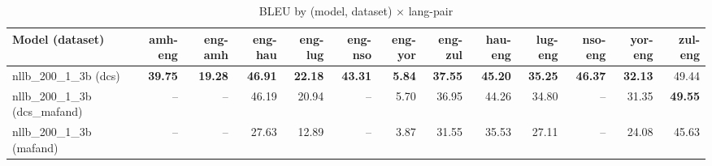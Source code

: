 \begin{table}[t]
\centering
\caption{BLEU by (model, dataset) × lang-pair}
\begin{tabular}{lrrrrrrrrrrrr}
\toprule
Model (dataset) & amh-eng & eng-amh & eng-hau & eng-lug & eng-nso & eng-yor & eng-zul & hau-eng & lug-eng & nso-eng & yor-eng & zul-eng \\
\midrule
nllb\_200\_1\_3b (dcs) & \textbf{39.75} & \textbf{19.28} & \textbf{46.91} & \textbf{22.18} & \textbf{43.31} & \textbf{5.84} & \textbf{37.55} & \textbf{45.20} & \textbf{35.25} & \textbf{46.37} & \textbf{32.13} & 49.44 \\
nllb\_200\_1\_3b (dcs\_mafand) & -- & -- & 46.19 & 20.94 & -- & 5.70 & 36.95 & 44.26 & 34.80 & -- & 31.35 & \textbf{49.55} \\
nllb\_200\_1\_3b (mafand) & -- & -- & 27.63 & 12.89 & -- & 3.87 & 31.55 & 35.53 & 27.11 & -- & 24.08 & 45.63 \\
\bottomrule
\end{tabular}
\end{table}